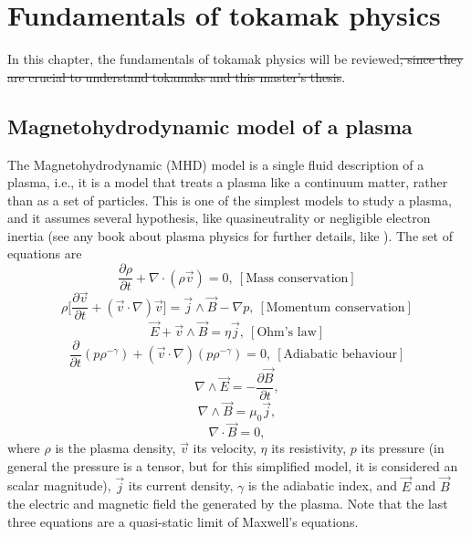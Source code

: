 \documentclass[a4paper,12pt,oneside]{book}
\newcommand{\p}{\partial}
\begin{document}
\chapter{Fundamentals of tokamak physics}

In this chapter, the fundamentals of tokamak physics will be reviewed\st{, since they are crucial to understand tokamaks and this master's thesis}.


\section{Magnetohydrodynamic model of a plasma}
The Magnetohydrodynamic (MHD) model is a single fluid description of a plasma, i.e., it is a model that treats a plasma like a continuum matter, rather than as a set of particles. This is one of the simplest models to study a plasma, and it assumes several hypothesis, like quasineutrality or negligible electron inertia (see any book about plasma physics for further details, like \cite{Chen}). The set of equations are
%
\begin{equation}
\dfrac{\p \rho}{\p t}+\nabla \cdot (\rho \vec{v})=0, \ [\text{Mass conservation}] 
\end{equation}
\begin{equation} \label{momentum cons}
\rho \Big[\dfrac{\p \vec{v}}{\p t}+(\vec{v} \cdot \nabla)\vec{v} \Big]=\vec{j} \wedge \vec{B} -\nabla p, \ [\text{Momentum  conservation}] 
\end{equation}
\begin{equation}
\vec{E} +\vec{v} \wedge \vec{B}=\eta \vec{j}, \  [\text{Ohm's  law}] 
 \end{equation}
 \begin{equation}
\dfrac{\p}{\p t}(p \rho^{-\gamma})+(\vec{v} \cdot \nabla) (p \rho^{-\gamma})=0, \ [\text{Adiabatic  behaviour}] 
\end{equation}
\begin{equation} \label{faraday}
\nabla \wedge \vec{E}=- \dfrac{\p \vec{B}}{\p t},  
\end{equation}
\begin{equation}\label{ampere}
\nabla \wedge \vec{B}=\mu_0 \vec{j}, 
\end{equation}
\begin{equation} \label{nablaBnulo}
\nabla \cdot \vec{B}=0, 
\end{equation}
%
where $\rho$ is the plasma density, $\vec{v}$ its velocity, $\eta$ its resistivity, $p$ its pressure (in general the pressure is a tensor, but for this simplified model, it is considered an scalar magnitude), $\vec{j}$ its current density, $\gamma$ is the adiabatic index, and $\vec{E}$ and $\vec{B}$ the electric and magnetic field the generated by the plasma. Note that the last three equations are a quasi-static limit of Maxwell's equations.
\end{document}
